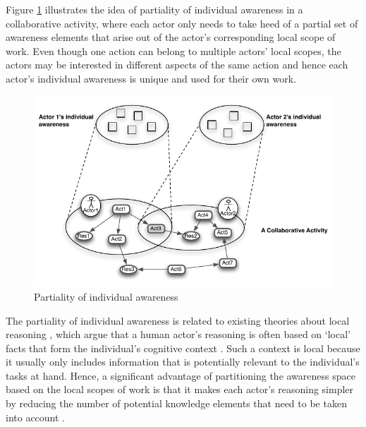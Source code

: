 Figure \ref{fig:partiality_of_awareness} illustrates the idea of partiality of individual awareness in a collaborative activity, where each actor only needs to take heed of a partial set of awareness elements that arise out of the actor's corresponding local scope of work. Even though one action can belong to multiple actors' local scopes, the actors may be interested in different aspects of the same action and hence each actor's individual awareness is unique and used for their own work.

\begin{figure}[htbp] %
   \centering
   \includegraphics{partiality_of_awareness.pdf} 
   \caption{Partiality of individual awareness}
   \label{fig:partiality_of_awareness}
\end{figure}

The partiality of individual awareness is related to existing theories about local reasoning \cite{Benerecetti2000,ghidini2001local}, which argue that a human actor's reasoning is often based on `local' facts that form the individual’s cognitive context \cite{Benerecetti2000}. Such a context is local because it usually only includes information that is potentially relevant to the individual’s tasks at hand. Hence, a significant advantage of partitioning the awareness space based on the local scopes of work is that it makes each actor's reasoning simpler by reducing the number of potential knowledge elements that need to be taken into account \cite{ghidini2001local}.  

